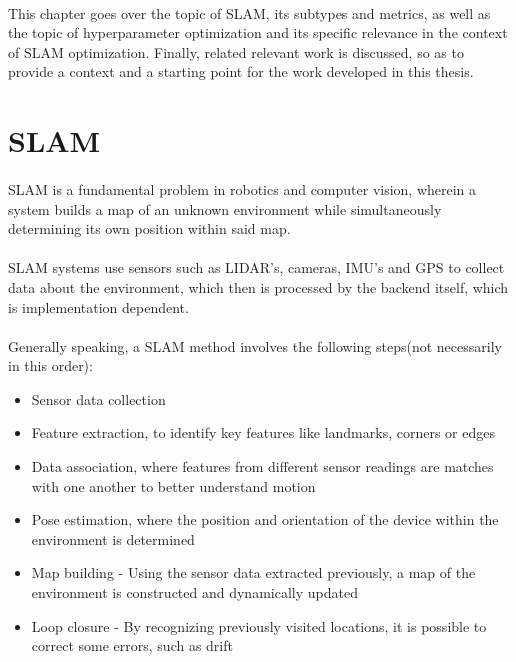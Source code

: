 \paragraph{}This chapter goes over the topic of SLAM, its subtypes and metrics, as well as the topic of hyperparameter optimization and its specific relevance in the context of SLAM optimization. Finally, related relevant work is discussed, so as to provide a context and a starting point for the work developed in this thesis.

\section{\ac{SLAM}}
\paragraph{}\ac{SLAM} is a fundamental problem in robotics and computer vision, wherein a system builds a map of an unknown environment while simultaneously determining its own position within said map\cite{taheri2021slam}.
\paragraph{}SLAM systems use sensors such as LIDAR's, cameras, IMU's and GPS to collect data about the environment, which then is processed by the backend itself\cite{taheri2021slam}, which is implementation dependent.
\paragraph{}Generally speaking, a SLAM method involves the following steps(not necessarily in this order):
\begin{itemize}
    \item Sensor data collection
    \item Feature extraction, to identify key features like landmarks, corners or edges
    \item Data association, where features from different sensor readings are matches with one another to better understand motion
    \item Pose estimation, where the position and orientation of the device within the environment is determined
    \item Map building - Using the sensor data extracted previously, a map of the environment is constructed and dynamically updated
    \item Loop closure - By recognizing previously visited locations, it is possible to correct some errors, such as drift
\end{itemize}

